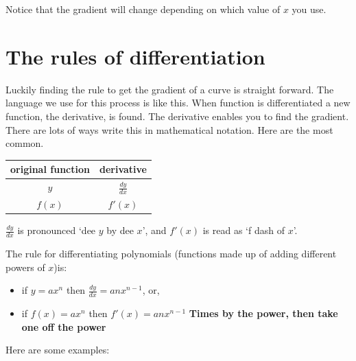 \documentclass[
  a4paper,
]{scrbook}
\providecommand{\tightlist}{%
  \setlength{\itemsep}{0pt}\setlength{\parskip}{0pt}}\usepackage{longtable,booktabs,array}
\begin{document}
Notice that the gradient will change depending on which value of \(x\)
you use.

\hypertarget{the-rules-of-differentiation}{%
\section{The rules of
differentiation}\label{the-rules-of-differentiation}}

Luckily finding the rule to get the gradient of a curve is straight
forward. The language we use for this process is like this. When
function is differentiated a new function, the derivative, is found. The
derivative enables you to find the gradient. There are lots of ways
write this in mathematical notation. Here are the most common.

\begin{longtable}[]{@{}cc@{}}
\toprule()
original function & derivative \\
\midrule()
\endhead
\(y\) & \(\frac{dy}{dx}\) \\
\(f(x)\) & \(f'(x)\) \\
\bottomrule()
\end{longtable}

\(\frac{dy}{dx}\) is pronounced `dee \(y\) by dee \(x\)', and \(f'(x)\)
is read as `f dash of \(x\)'.

The rule for differentiating polynomials (functions made up of adding
different powers of \(x\))is:

\begin{tcolorbox}[enhanced jigsaw, opacityback=0, left=2mm, toptitle=1mm, title=\textcolor{quarto-callout-note-color}{\faInfo}\hspace{0.5em}{Note}, breakable, colbacktitle=quarto-callout-note-color!10!white, opacitybacktitle=0.6, bottomtitle=1mm, arc=.35mm, colback=white, leftrule=.75mm, bottomrule=.15mm, colframe=quarto-callout-note-color-frame, rightrule=.15mm, titlerule=0mm, toprule=.15mm, coltitle=black]

\begin{itemize}
\tightlist
\item
  if \(y=ax^n\) then \(\frac{dy}{dx} = anx^{n-1}\), or,
\item
  if \(f(x)=ax^n\) then \(f'(x) = anx^{n-1}\) \textbf{Times by the
  power, then take one off the power}
\end{itemize}

\end{tcolorbox}

Here are some examples:
\end{document}
